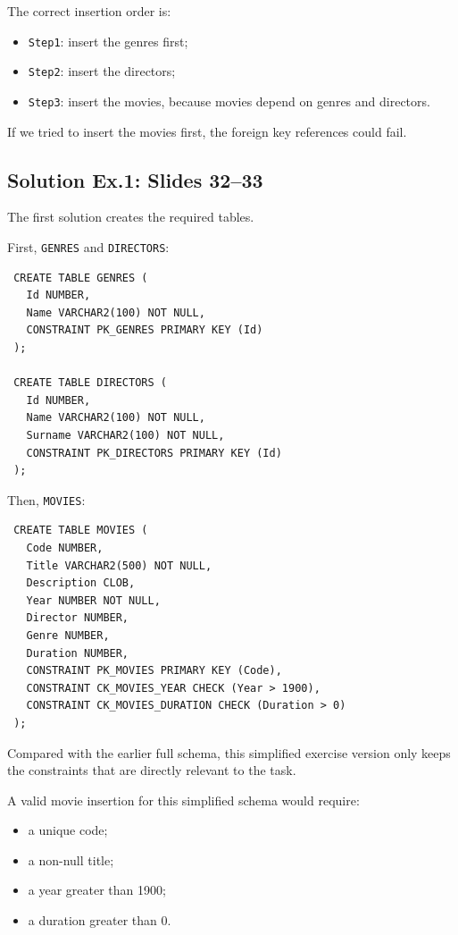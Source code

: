  \begin{example}
  The correct insertion order is:
  \begin{itemize}
   \item \texttt{Step1}: insert the genres first;
   \vspace{0.2cm}
   \item \texttt{Step2}: insert the directors;
   \vspace{0.2cm}
   \item \texttt{Step3}: insert the movies, because movies depend on genres and directors.
  \end{itemize}

  If we tried to insert the movies first, the foreign key references could fail.
 \end{example}

 \subsection{Solution Ex.1: Slides 32--33}

 The first solution creates the required tables.

 First, \texttt{GENRES} and \texttt{DIRECTORS}:

 \begin{verbatim}
 CREATE TABLE GENRES (
   Id NUMBER,
   Name VARCHAR2(100) NOT NULL,
   CONSTRAINT PK_GENRES PRIMARY KEY (Id)
 );

 CREATE TABLE DIRECTORS (
   Id NUMBER,
   Name VARCHAR2(100) NOT NULL,
   Surname VARCHAR2(100) NOT NULL,
   CONSTRAINT PK_DIRECTORS PRIMARY KEY (Id)
 );
 \end{verbatim}
 \vspace{-0.4cm}

 Then, \texttt{MOVIES}:

 \begin{verbatim}
 CREATE TABLE MOVIES (
   Code NUMBER,
   Title VARCHAR2(500) NOT NULL,
   Description CLOB,
   Year NUMBER NOT NULL,
   Director NUMBER,
   Genre NUMBER,
   Duration NUMBER,
   CONSTRAINT PK_MOVIES PRIMARY KEY (Code),
   CONSTRAINT CK_MOVIES_YEAR CHECK (Year > 1900),
   CONSTRAINT CK_MOVIES_DURATION CHECK (Duration > 0)
 );
 \end{verbatim}
 \vspace{-0.4cm}

 Compared with the earlier full schema, this simplified exercise version only keeps the constraints that are directly relevant to the task.

 \begin{example}
  A valid movie insertion for this simplified schema would require:
  \begin{itemize}
   \item a unique code;
   \vspace{0.2cm}
   \item a non-null title;
   \vspace{0.2cm}
   \item a year greater than 1900;
   \vspace{0.2cm}
   \item a duration greater than 0.
  \end{itemize}
 \end{example}

